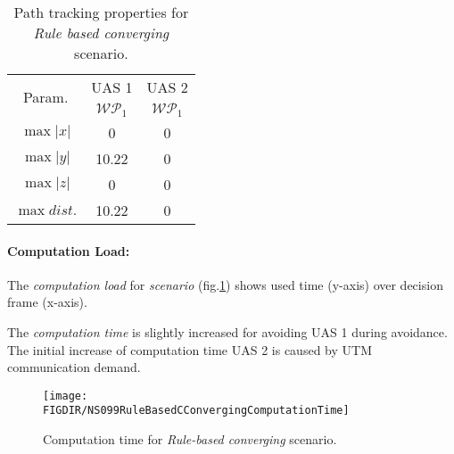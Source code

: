 \begin{table}[H]
    \centering
    \begin{tabular}{c||c|c}
        \multirow{2}{*}{Param.} & UAS 1     & UAS 2              \\\cline{2-3}
                        & $\mathscr{WP}_1$  & $\mathscr{WP}_1$   \\\hline\hline
          $\max |x|$    & 0                 & 0                  \\\hline
          $\max |y|$    & 10.22             & 0                  \\\hline
          $\max |z|$    & 0                 & 0                  \\\hline
          $\max dist.$  & 10.22             & 0                  \\
    \end{tabular}
    \caption{Path tracking properties for \emph{Rule based converging} scenario.}
    \label{tab:pathTrackingParametersForRuleBasedConverging}
\end{table}

\newpage
\paragraph{Computation Load:} The \emph{computation load} for \emph{scenario} (fig.\ref{fig:ruleBasedCConvergingComputationTime}) shows used time (y-axis) over decision frame (x-axis).

The \emph{computation time} is slightly increased for avoiding UAS 1 during avoidance. The initial increase of computation time UAS 2 is caused by UTM communication demand.

\begin{figure}[H]
    \centering
    \texttt{[image: \\FIGDIR/NS099RuleBasedCConvergingComputationTime]} 
    \caption{Computation time for \emph{Rule-based converging} scenario.}
    \label{fig:ruleBasedCConvergingComputationTime}
\end{figure}